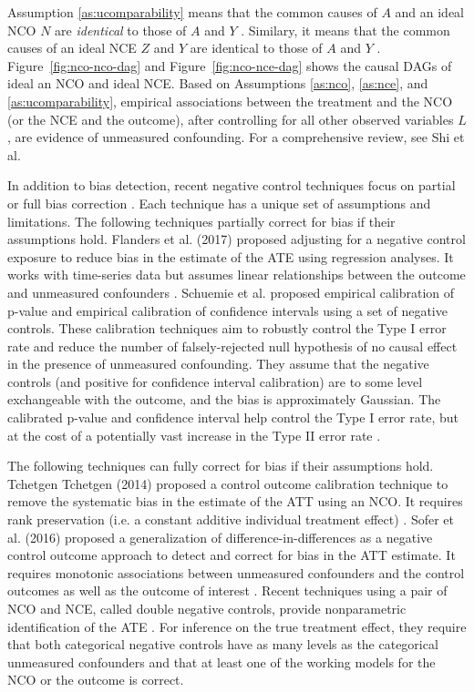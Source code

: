 Assumption \ref{as:ucomparability} means that the common causes of $A$ and an ideal NCO $N$ are \textit{identical} to those of $A$ and $Y$ \cite{lipsitch2010negative}. Similary, it means that the common causes of an ideal NCE $Z$ and $Y$ are identical to those of $A$ and $Y$ \cite{lipsitch2010negative}. Figure~\ref{fig:nco-nco-dag} and Figure~\ref{fig:nco-nce-dag} shows the causal DAGs of ideal an NCO and ideal NCE. Based on Assumptions \ref{as:nco}, \ref{as:nce}, and \ref{as:ucomparability}, empirical associations between the treatment and the NCO (or the NCE and the outcome), after controlling for all other observed variables $L$, are evidence of unmeasured confounding. For a comprehensive review, see Shi et al. \cite{shi2020selective}

In addition to bias detection, recent negative control techniques focus on partial or full bias correction \cite{shi2020selective}. Each technique has a unique set of assumptions and limitations. The following techniques partially correct for bias if their assumptions hold. Flanders et al. (2017) proposed adjusting for a negative control exposure to reduce bias in the estimate of the ATE using regression analyses. It works with time-series data but assumes linear relationships between the outcome and unmeasured confounders \cite{flanders2017new}. Schuemie et al. proposed empirical calibration of p-value \cite{schuemie2016robust} and empirical calibration of confidence intervals \cite{schuemie2018empirical} using a set of negative controls. These calibration techniques aim to robustly control the Type I error rate and reduce the number of falsely-rejected null hypothesis of no causal effect in the presence of unmeasured confounding. They assume that the negative controls (and positive for confidence interval calibration) are to some level exchangeable with the outcome, and the bias is approximately Gaussian. The calibrated p-value and confidence interval help control the Type I error rate, but at the cost of a potentially vast increase in the Type II error rate \cite{gruber2016limitations}.

The following techniques can fully correct for bias if their assumptions hold. Tchetgen Tchetgen (2014) proposed a control outcome calibration technique to remove the systematic bias in the estimate of the ATT using an NCO. It requires rank preservation (i.e. a constant additive individual treatment effect) \cite{tchetgen2014control}. Sofer et al. (2016) proposed a generalization of difference-in-differences as a negative control outcome approach to detect and correct for bias in the ATT estimate. It requires monotonic associations between unmeasured confounders and the control outcomes as well as the outcome of interest \cite{sofer2016negative}. Recent techniques using a pair of NCO and NCE, called double negative controls, provide nonparametric identification of the ATE \cite{miao2018identifying, shi2020multiply}. For inference on the true treatment effect, they require that both categorical negative controls have as many levels as the categorical unmeasured confounders and that at least one of the working models for the NCO or the outcome is correct.

